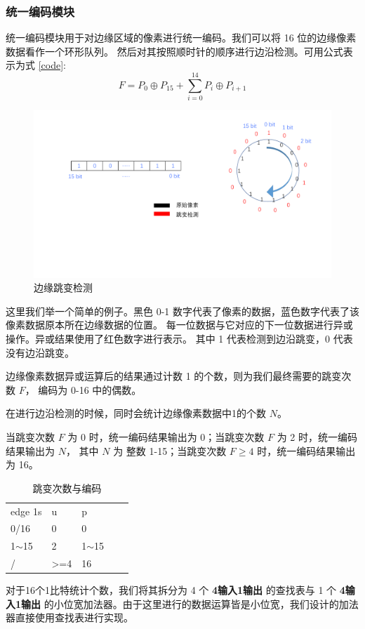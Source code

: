 \documentclass[12pt, a4paper, oneside]{ctexbook}
\begin{document}
	\subsubsection{统一编码模块}
	统一编码模块用于对边缘区域的像素进行统一编码。我们可以将 16 位的边缘像素数据看作一个环形队列。
	然后对其按照顺时针的顺序进行边沿检测。可用公式表示为式 \ref{code}:
	\begin{equation}
		F=P_{0}\oplus P_{15} + \sum_{i=0}^{14}P_i \oplus P_{i+1}
		\label{code}
	\end{equation}
	\par
	\begin{figure}[h]	
		\centering
		\includegraphics[scale=0.5]{pic/uniform.pdf}
		\caption{边缘跳变检测}
	\end{figure}
	这里我们举一个简单的例子。黑色 0-1 数字代表了像素的数据，蓝色数字代表了该像素数据原本所在边缘数据的位置。
	每一位数据与它对应的下一位数据进行异或操作。异或结果使用了红色数字进行表示。
	其中 1 代表检测到边沿跳变，0 代表没有边沿跳变。
	\par 	边缘像素数据异或运算后的结果通过计数 1 的个数，则为我们最终需要的跳变次数 $F$，
	编码为 0-16 中的偶数。\par 在进行边沿检测的时候，同时会统计边缘像素数据中1的个数 $N$。
	\par 当跳变次数 $F$ 为 0 时，统一编码结果输出为 0；当跳变次数 $F$ 为 2 时，统一编码结果输出为 $N$，
	其中 $N$ 为 整数 1-15；当跳变次数 $F \geq 4$ 时，统一编码结果输出为
	16。
	\begin{table}[h]
		\centering
		\begin{tabular}{|l|l|l|ll}
			\cline{1-3}
			edge 1s   & u                & p           \\ \cline{1-3}
			0/16      & 0                & 0           \\ \cline{1-3}
			1$\sim$15 & 2                & 1$\sim$15   \\ \cline{1-3}
			/         & \textgreater{}=4 & 16          \\ \cline{1-3}
		\end{tabular}
		\caption{跳变次数与编码}
	\end{table}
	\par 对于16个1比特统计个数，我们将其拆分为 4 个 \textbf{4输入1输出} 的查找表与 1 个 \textbf{4输入1输出} 的小位宽加法器。由于这里进行的数据运算皆是小位宽，我们设计的加法器直接使用查找表进行实现。
\end{document}
